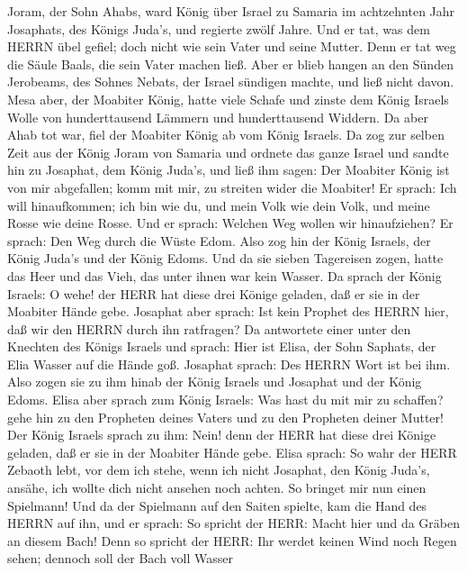  Joram, der Sohn Ahabs, ward König über Israel zu Samaria im
achtzehnten Jahr Josaphats, des Königs Juda's, und regierte zwölf Jahre.
 Und er tat, was dem HERRN übel gefiel; doch nicht wie sein
Vater und seine Mutter. Denn er tat weg die Säule Baals, die sein Vater
machen ließ.  Aber er blieb hangen an den Sünden Jerobeams,
des Sohnes Nebats, der Israel sündigen machte, und ließ nicht davon.
 Mesa aber, der Moabiter König, hatte viele Schafe und
zinste dem König Israels Wolle von hunderttausend Lämmern und
hunderttausend Widdern.  Da aber Ahab tot war, fiel der
Moabiter König ab vom König Israels.  Da zog zur selben Zeit
aus der König Joram von Samaria und ordnete das ganze Israel
 und sandte hin zu Josaphat, dem König Juda's, und ließ ihm
sagen: Der Moabiter König ist von mir abgefallen; komm mit mir, zu
streiten wider die Moabiter! Er sprach: Ich will hinaufkommen; ich bin
wie du, und mein Volk wie dein Volk, und meine Rosse wie deine Rosse.
 Und er sprach: Welchen Weg wollen wir hinaufziehen? Er
sprach: Den Weg durch die Wüste Edom.  Also zog hin der
König Israels, der König Juda's und der König Edoms. Und da sie sieben
Tagereisen zogen, hatte das Heer und das Vieh, das unter ihnen war kein
Wasser.  Da sprach der König Israels: O wehe! der HERR hat
diese drei Könige geladen, daß er sie in der Moabiter Hände gebe.
 Josaphat aber sprach: Ist kein Prophet des HERRN hier, daß
wir den HERRN durch ihn ratfragen? Da antwortete einer unter den
Knechten des Königs Israels und sprach: Hier ist Elisa, der Sohn
Saphats, der Elia Wasser auf die Hände goß.  Josaphat
sprach: Des HERRN Wort ist bei ihm. Also zogen sie zu ihm hinab der
König Israels und Josaphat und der König Edoms.  Elisa aber
sprach zum König Israels: Was hast du mit mir zu schaffen? gehe hin zu
den Propheten deines Vaters und zu den Propheten deiner Mutter! Der
König Israels sprach zu ihm: Nein! denn der HERR hat diese drei Könige
geladen, daß er sie in der Moabiter Hände gebe.  Elisa
sprach: So wahr der HERR Zebaoth lebt, vor dem ich stehe, wenn ich nicht
Josaphat, den König Juda's, ansähe, ich wollte dich nicht ansehen noch
achten.  So bringet mir nun einen Spielmann! Und da der
Spielmann auf den Saiten spielte, kam die Hand des HERRN auf ihn,
 und er sprach: So spricht der HERR: Macht hier und da
Gräben an diesem Bach!  Denn so spricht der HERR: Ihr
werdet keinen Wind noch Regen sehen; dennoch soll der Bach voll Wasser
